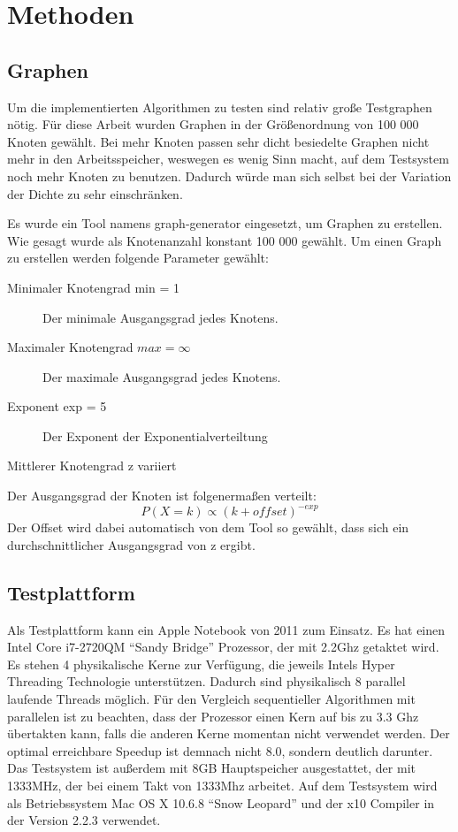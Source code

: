 
\chapter{Methoden} %
\label{cha:methoden}

\section{Graphen} %
\label{sec:graphen}
Um die implementierten Algorithmen zu testen sind relativ große Testgraphen nötig. Für diese Arbeit wurden Graphen in der Größenordnung von 100 000 Knoten gewählt. Bei mehr Knoten passen sehr dicht besiedelte Graphen nicht mehr in den Arbeitsspeicher, weswegen es wenig Sinn macht, auf dem Testsystem noch mehr Knoten zu benutzen. Dadurch würde man sich selbst bei der Variation der Dichte zu sehr einschränken. 

Es wurde ein Tool namens graph-generator \cite{graph-generator:2009:Online} eingesetzt, um Graphen zu erstellen. Wie gesagt wurde als Knotenanzahl konstant 100 000 gewählt. Um einen Graph zu erstellen werden folgende Parameter gewählt:
\begin{description}
	\item[Minimaler Knotengrad min = 1] Der minimale Ausgangsgrad jedes Knotens.
	\item[Maximaler Knotengrad $max = \infty$] Der maximale Ausgangsgrad jedes Knotens.
	\item[Exponent exp = 5] Der Exponent der Exponentialverteiltung
	\item[Mittlerer Knotengrad z variiert]
\end{description}
Der Ausgangsgrad der Knoten ist folgenermaßen verteilt:
$$
P(X=k) \propto (k + offset)^{-exp}
$$
Der Offset wird dabei automatisch von dem Tool so gewählt, dass sich ein durchschnittlicher Ausgangsgrad von z ergibt.

\section{Testplattform} %
\label{sec:testplattform}
Als Testplattform kann ein Apple Notebook von 2011 zum Einsatz. Es hat einen Intel Core i7-2720QM \enquote{Sandy Bridge} Prozessor, der mit 2.2Ghz getaktet wird. Es stehen 4 physikalische Kerne zur Verfügung, die jeweils Intels Hyper Threading Technologie unterstützen. Dadurch sind physikalisch 8 parallel laufende Threads möglich. Für den Vergleich sequentieller Algorithmen mit parallelen ist zu beachten, dass der Prozessor einen Kern auf bis zu 3.3 Ghz übertakten kann, falls die anderen Kerne momentan nicht verwendet werden. Der optimal erreichbare Speedup ist demnach nicht 8.0, sondern deutlich darunter. Das Testsystem ist außerdem mit 8GB Hauptspeicher ausgestattet, der mit 1333MHz, der bei einem Takt von 1333Mhz arbeitet. Auf dem Testsystem wird als Betriebssystem Mac OS X 10.6.8 \enquote{Snow Leopard} und der x10 Compiler in der Version 2.2.3 verwendet.

